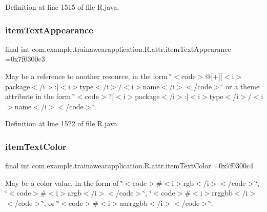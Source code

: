 Definition at line 1515 of file R.\+java.

\mbox{\label{classcom_1_1example_1_1trainawearapplication_1_1_r_1_1attr_ae7ecd82e57ffd58e4377e7bcec9c6480}} 
\subsubsection{\texorpdfstring{itemTextAppearance}{itemTextAppearance}}
{\footnotesize\ttfamily final int com.\+example.\+trainawearapplication.\+R.\+attr.\+item\+Text\+Appearance =0x7f0300c3\hspace{0.3cm}{\ttfamily [static]}}

May be a reference to another resource, in the form \char`\"{}$<$code$>$@\mbox{[}+\mbox{]}\mbox{[}$<$i$>$package$<$/i$>$\+:\mbox{]}$<$i$>$type$<$/i$>$/$<$i$>$name$<$/i$>$$<$/code$>$\char`\"{} or a theme attribute in the form \char`\"{}$<$code$>$?\mbox{[}$<$i$>$package$<$/i$>$\+:\mbox{]}$<$i$>$type$<$/i$>$/$<$i$>$name$<$/i$>$$<$/code$>$\char`\"{}. 

Definition at line 1522 of file R.\+java.

\mbox{\label{classcom_1_1example_1_1trainawearapplication_1_1_r_1_1attr_ad6d1eeb7d218baf7075cb5ef6014e9f4}} 
\subsubsection{\texorpdfstring{itemTextColor}{itemTextColor}}
{\footnotesize\ttfamily final int com.\+example.\+trainawearapplication.\+R.\+attr.\+item\+Text\+Color =0x7f0300c4\hspace{0.3cm}{\ttfamily [static]}}

May be a color value, in the form of \char`\"{}$<$code$>$\#$<$i$>$rgb$<$/i$>$$<$/code$>$\char`\"{}, \char`\"{}$<$code$>$\#$<$i$>$argb$<$/i$>$$<$/code$>$\char`\"{}, \char`\"{}$<$code$>$\#$<$i$>$rrggbb$<$/i$>$$<$/code$>$\char`\"{}, or \char`\"{}$<$code$>$\#$<$i$>$aarrggbb$<$/i$>$$<$/code$>$\char`\"{}. 

